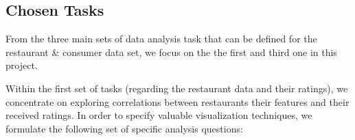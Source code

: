 

\subsection{Chosen Tasks}
From the three main sets of data analysis task that can be defined for the restaurant \& consumer data set, we focus on the the first and third one in this project.

Within the first set of tasks (regarding the restaurant data and their ratings), we concentrate on exploring correlations between restaurants their features and their received ratings. In order to specify valuable visualization techniques, we formulate the following set of specific analysis questions:

